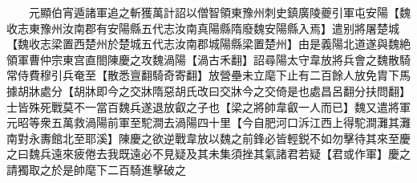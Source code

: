 　　元顯伯宵遁諸軍追之斬獲萬計詔以僧智領東豫州刺史鎮廣陵夔引軍屯安陽【魏收志東豫州汝南郡有安陽縣五代志汝南真陽縣隋廢魏安陽縣入焉】遣别將屠楚城【魏收志梁置西楚州於楚城五代志汝南郡城陽縣梁置楚州】由是義陽北道遂與魏絶　領軍曹仲宗東宫直閤陳慶之攻魏渦陽【渦古禾翻】詔尋陽太守韋放將兵會之魏散騎常侍費穆引兵奄至【散悉亶翻騎奇寄翻】放營壘未立麾下止有二百餘人放免胄下馬據胡牀處分【胡牀即今之交牀隋惡胡氏改曰交牀今之交倚是也處昌呂翻分扶問翻】士皆殊死戰莫不一當百魏兵遂退放叡之子也【梁之將帥韋叡一人而已】魏又遣將軍元昭等衆五萬救渦陽前軍至駝澗去渦陽四十里【今自肥河口泝江西上得駝澗灘其灘南對永夀館北至耶溪】陳慶之欲逆戰韋放以魏之前鋒必皆輕鋭不如勿擊待其來至慶之曰魏兵遠來疲倦去我既遠必不見疑及其未集須挫其氣諸君若疑【君或作軍】慶之請獨取之於是帥麾下二百騎進擊破之